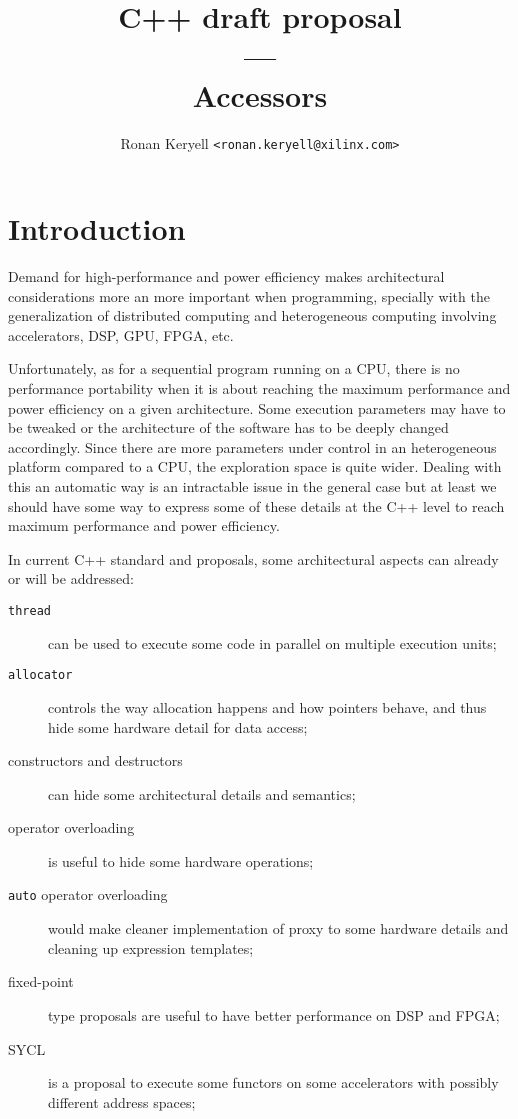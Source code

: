 \documentclass{article}
\title{C++ draft proposal\\
  ---\\
  Accessors}
\author{Ronan Keryell \texttt{<ronan.keryell@xilinx.com>}}
\begin{document}
\maketitle

\section{Introduction}
\label{sec:introduction}

Demand for high-performance and power efficiency makes architectural
considerations more an more important when programming, specially with
the generalization of distributed computing and heterogeneous
computing involving accelerators, DSP, GPU, FPGA, etc.

Unfortunately, as for a sequential program running on a CPU, there is
no performance portability when it is about reaching the maximum
performance and power efficiency on a given architecture. Some
execution parameters may have to be tweaked or the architecture of the
software has to be deeply changed accordingly. Since there are more
parameters under control in an heterogeneous platform compared to a
CPU, the exploration space is quite wider. Dealing with
this an automatic way is an intractable issue in the general case but
at least we should have some way to express some of these details at
the C++ level to reach maximum performance and power efficiency.

In current C++ standard and proposals, some architectural aspects can
already or will be addressed:
\begin{description}
\item[\texttt{thread}] can be used to execute some code in parallel
  on multiple execution units;
\item[\texttt{allocator}] controls the way allocation happens and how
  pointers behave, and thus hide some hardware detail for data access;
\item[constructors and destructors] can hide some architectural details
  and semantics;
\item[operator overloading] is useful to hide some hardware
  operations;
\item[\texttt{auto} operator overloading] would make cleaner implementation of
  proxy to some hardware details and cleaning up expression templates;
\item[fixed-point] type proposals are useful to have better
  performance on DSP and FPGA;
\item[SYCL] is a proposal to execute some functors on some
  accelerators with possibly different address spaces;
\end{description}
\end{document}
